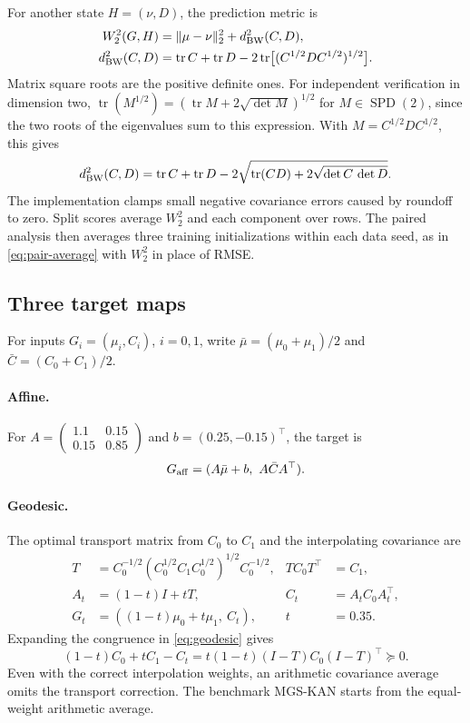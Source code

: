 \documentclass[11pt]{article}
\let\StudyMathSubsection\subsection
\newcommand{\SPD}{\operatorname{SPD}}
\newcommand{\tr}{\operatorname{tr}}
\newcommand{\norm}[1]{\lVert #1\rVert}
\begin{document}
For another state \(H=(\nu,D)\), the prediction metric is
\begin{align}
 W_2^2(G,H)&=\norm{\mu-\nu}_2^2+d_{\rm BW}^2(C,D),\label{eq:w2}\\
 d_{\rm BW}^2(C,D)&=\tr C+\tr D-2\tr\bigl[(C^{1/2}DC^{1/2})^{1/2}\bigr].
 \nonumber
\end{align}
Matrix square roots are the positive definite ones. For independent
verification in dimension two, \(\tr(M^{1/2})=(\tr M+2\sqrt{\det
M})^{1/2}\) for \(M\in\SPD(2)\), since the two roots of the eigenvalues
sum to this expression. With \(M=C^{1/2}DC^{1/2}\), this gives
\begin{equation}
 d_{\rm BW}^2(C,D)=
 \tr C+\tr D-2\sqrt{\tr(CD)+2\sqrt{\det C\,\det D}} .
 \label{eq:w2-det}
\end{equation}
The implementation clamps small negative covariance errors caused by
roundoff to zero. Split scores average \(W_2^2\) and each component over
rows. The paired analysis then averages three training initializations
within each data seed, as in \eqref{eq:pair-average} with \(W_2^2\) in
place of RMSE.

\StudyMathSubsection{Three target maps}

For inputs \(G_i=(\mu_i,C_i)\), \(i=0,1\), write
\(\bar\mu=(\mu_0+\mu_1)/2\) and \(\bar C=(C_0+C_1)/2\).

\paragraph{Affine.}
For \(A=\left(\begin{smallmatrix}1.1&0.15\\0.15&0.85\end{smallmatrix}\right)\)
and \(b=(0.25,-0.15)^\top\), the target is
\[
 G_{\rm aff}=(A\bar\mu+b,\ A\bar C A^\top).
\]

\paragraph{Geodesic.}
The optimal transport matrix from \(C_0\) to \(C_1\) and the
interpolating covariance are \cite{bhatia2019}
\begin{align}
 T&=C_0^{-1/2}(C_0^{1/2}C_1C_0^{1/2})^{1/2}C_0^{-1/2},
       &T C_0T^\top&=C_1,\nonumber\\
 A_t&=(1-t)I+tT,& C_t&=A_t C_0 A_t^\top,\label{eq:geodesic}\\
 G_t&=((1-t)\mu_0+t\mu_1,\ C_t),& t&=0.35.\nonumber
\end{align}
Expanding the congruence in \eqref{eq:geodesic} gives
\begin{equation}
 (1-t)C_0+tC_1-C_t
    =t(1-t)(I-T)C_0(I-T)^\top\succeq 0 .
 \label{eq:arithmetic-gap}
\end{equation}
Even with the correct interpolation weights, an arithmetic covariance
average omits the transport correction. The benchmark MGS-KAN starts
from the equal-weight arithmetic average.
\end{document}
